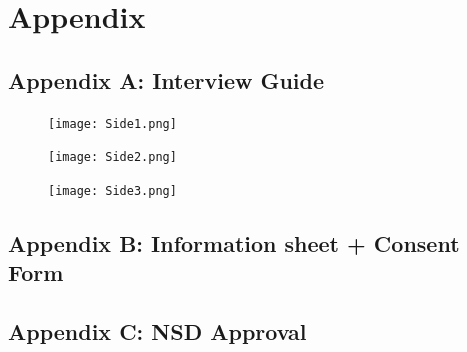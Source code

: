 \chapter*{Appendix}

\section{Appendix A: Interview Guide}

\begin{figure}
\texttt{[image: Side1.png]}
\end{figure}

\begin{figure}
    \centering
    \texttt{[image: Side2.png]}
\end{figure}

\begin{figure}
    \centering
    \texttt{[image: Side3.png]}
\end{figure}

\section{Appendix B: Information sheet + Consent Form}


\section{Appendix C: NSD Approval}


